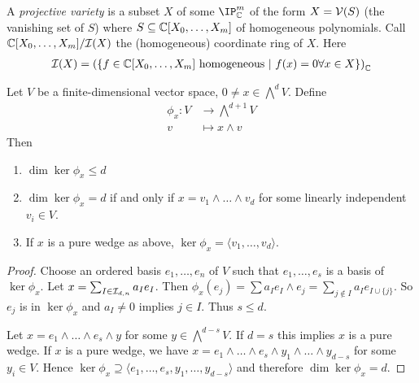 \documentclass{skript}
\begin{document}
\begin{definition}
    A \emph{projective variety} is a subset $X$ of some $\IP^m_{\IC}$ of the form $X=\mathcal{V}(S)$ (the vanishing set of $S$) where $S\subseteq \mathbb{C}[X_0,\dots, X_m]$ of homogeneous polynomials. 
    Call $\mathbb{C}[X_0, \dots, X_m]/\mathcal{I}(X)$ the (homogeneous) coordinate ring of $X$.
    Here 
    \begin{align*}
        \mathcal{I}(X) = \left(\left\{f\in \mathbb{C}[X_0,\dots,X_m] \text{ homogeneous}\ \middle|\  f(x) = 0 \forall x\in X\right\}\right)_{\mathbb{C}}
    \end{align*}
    
\end{definition}
\begin{lemma}\label{lem:phix}
    Let $V$ be a finite-dimensional vector space, $0\neq x\in \bigwedge^d V$.
    Define 
    \begin{align*}
        \phi_x \colon V&\longrightarrow \bigwedge^{d+1} V\\
        v &\longmapsto x\wedge v
    \end{align*}
    Then
    \begin{enumerate}
        \item
            $\dim \ker \phi_x \leq d$
        \item
            $\dim \ker \phi_x = d$ if and only if $x = v_1\wedge \dots \wedge v_d$ for some linearly independent $v_i\in V$.
        \item
            If $x$ is a pure wedge as above, $\ker \phi_x = \langle v_1,\dots, v_d\rangle$.
    \end{enumerate}
    
\end{lemma}
\begin{proof}
    Choose an ordered basis $e_1,\dots, e_n$ of $V$ such that $e_1, \dots, e_s$ is a basis of $\ker \phi_x$. 
    Let $x= \sum_{I\in \mathcal{I}_{d,n}} a_I e_I$.
    Then $\phi_x(e_j) = \sum a_I e_I \wedge e_j = \sum_{j\not\in I} a_I e_{I\cup\{j\}}$. So $e_j$ is in $\ker \phi_x$ and $a_I\neq 0$ implies $j\in I$.
    Thus $s\leq d$.

    Let $x= e_1\wedge \dots \wedge e_s \wedge y$ for some $y\in \bigwedge ^{d-s} V$. 
    If $d=s$ this implies $x$ is a pure wedge.
    If $x$ is a pure wedge, we have $x= e_1\wedge \dots \wedge e_s \wedge y_1\wedge\dots \wedge y_{d-s}$ for some $y_i\in V$.
    Hence $\ker\phi_x\supseteq \langle e_1,\dots, e_s, y_1,\dots, y_{d-s}\rangle$ and therefore $\dim \ker \phi_x = d$.
\end{proof}
\end{document}
